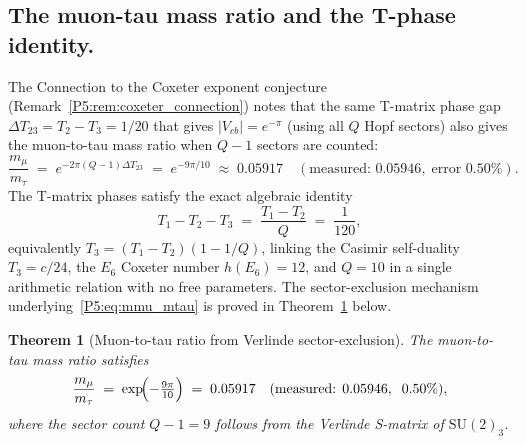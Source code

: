 \documentclass[11pt,a4paper]{article}
\newtheorem{theorem}{Theorem}[section]
\theoremstyle{definition}
\theoremstyle{remark}
\begin{document}
\subsection{The muon-tau mass ratio and the T-phase identity.}
The Connection to the Coxeter exponent conjecture (Remark~\ref{P5:rem:coxeter_connection}) notes
that the same T-matrix phase gap $\Delta T_{23}=T_2-T_3=1/20$ that
gives $|V_{cb}|=e^{-\pi}$ (using all $Q$ Hopf sectors) also gives the
muon-to-tau mass ratio when $Q-1$ sectors are counted:
\begin{equation}
  \frac{m_\mu}{m_\tau}
  \;=\; e^{-2\pi(Q-1)\Delta T_{23}}
  \;=\; e^{-9\pi/10}
  \;\approx\; 0.05917
  \quad(\text{measured: }0.05946,\;\text{error }0.50\%).
  \label{P5:eq:mmu_mtau}
\end{equation}
The T-matrix phases satisfy the exact algebraic identity
\begin{equation}
  T_1 - T_2 - T_3 \;=\; \frac{T_1-T_2}{Q} \;=\; \frac{1}{120},
  \label{P5:eq:Tphase_identity}
\end{equation}
equivalently $T_3 = (T_1-T_2)(1-1/Q)$, linking the Casimir self-duality
$T_3=c/24$, the $E_6$ Coxeter number $h(E_6)=12$, and $Q=10$ in a single
arithmetic relation with no free parameters.
The sector-exclusion mechanism underlying~\eqref{P5:eq:mmu_mtau} is proved
in Theorem~\ref{P5:thm:mmu_mtau} below.

\begin{theorem}[Muon-to-tau ratio from Verlinde sector-exclusion]
\label{P5:thm:mmu_mtau}
The muon-to-tau mass ratio satisfies
\begin{equation}
  \frac{m_\mu}{m_\tau}
  \;=\; \exp\!\Bigl(-\tfrac{9\pi}{10}\Bigr)
  \;=\; 0.05917
  \quad(\text{measured: }0.05946,\;\;0.50\%),
  \label{P5:eq:mmu_mtau_proved}
\end{equation}
where the sector count $Q-1=9$ follows from the Verlinde S-matrix of $\mathrm{SU}(2)_3$.
\end{theorem}
\end{document}
